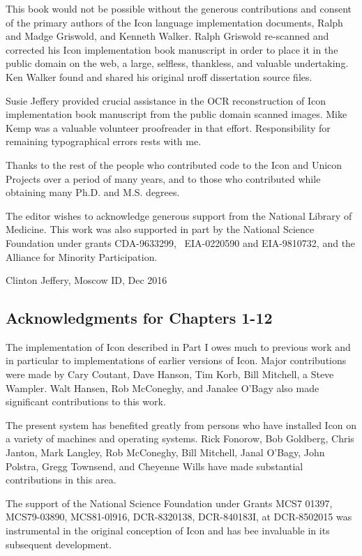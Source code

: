 This book would not be possible without the generous contributions and
consent of the primary authors of the Icon language implementation
documents, Ralph and Madge Griswold, and Kenneth Walker. Ralph
Griswold re-scanned and corrected his Icon implementation book
manuscript in order to place it in the public domain on the web, a
large, selfless, thankless, and valuable undertaking. Ken Walker found
and shared his original nroff dissertation source files.

Susie Jeffery provided crucial assistance in the OCR reconstruction of
Icon implementation book manuscript from the public domain scanned
images. Mike Kemp was a valuable volunteer proofreader in that
effort. Responsibility for remaining typographical errors rests with
me.

Thanks to the rest of the people who contributed code to the Icon and
Unicon Projects over a period of many years, and to those who
contributed while obtaining many Ph.D. and M.S. degrees.

The editor wishes to acknowledge generous support from the National
Library of Medicine. This work was also supported in part by the
National Science Foundation under grants CDA-9633299, \ EIA-0220590
and EIA-9810732, and the Alliance for Minority Participation.


Clinton Jeffery, Moscow ID, Dec 2016

\subsection*{Acknowledgments for Chapters 1-12}


The implementation of Icon described in Part I owes much to previous
work and in particular to implementations of earlier versions of
Icon. Major contributions were made by Cary Coutant, Dave Hanson, Tim
Korb, Bill Mitchell, a Steve Wampler. Walt Hansen, Rob McConeghy, and
Janalee O'Bagy also made significant contributions to this work.


The present system has benefited greatly from persons who have
installed Icon on a variety of machines and operating systems. Rick
Fonorow, Bob Goldberg, Chris Janton, Mark Langley, Rob McConeghy, Bill
Mitchell, Janal O'Bagy, John Polstra, Gregg Townsend, and Cheyenne
Wills have made substantial contributions in this area.

The support of the National Science Foundation under Grants MCS7
01397, MCS79-03890, MCS81-0l916, DCR-8320138, DCR-840183I, at
DCR-8502015 was instrumental in the original conception of Icon and
has bee invaluable in its subsequent development.

